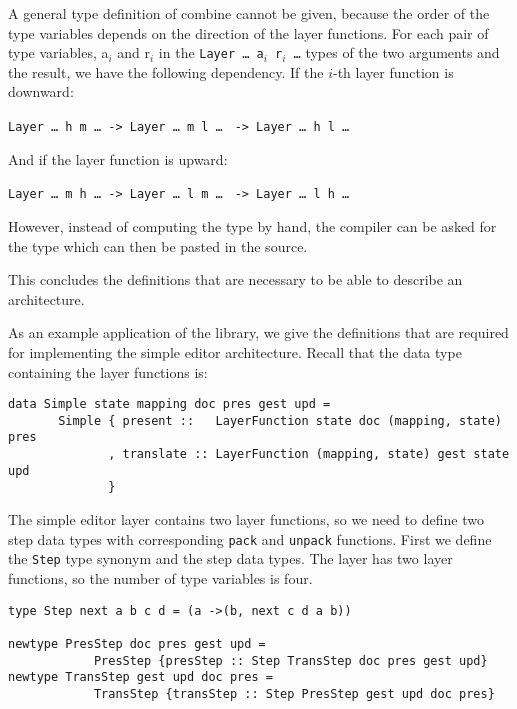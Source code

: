 A general type definition of combine cannot be given, because the order of the type variables depends on the direction of the layer functions. For each pair of type variables, a$_i$ and r$_i$ in the \texttt{Layer \dots~a$_i$ r$_i$ \dots} types of the two arguments and the result, we have the following dependency. If the $i$-th layer function is downward:

{\tt Layer \dots~h m \dots}\verb| -> |{\tt Layer \dots~m l \dots} \verb| -> |{\tt Layer \dots~h l \dots}

And if the layer function is upward:

{\tt Layer \dots~m h \dots}\verb| -> |{\tt Layer \dots~l m \dots} \verb| -> |{\tt Layer \dots~l h \dots}

However, instead of computing the type by hand, the compiler can be asked for the type which can then be pasted in the source.

This concludes the definitions that are necessary to be able to describe an architecture. 


 As an example application of the library, we give the definitions that are required for implementing the simple editor architecture. Recall that the data type containing the layer functions is:

\begin{small}
\begin{verbatim}
data Simple state mapping doc pres gest upd =
       Simple { present ::   LayerFunction state doc (mapping, state) pres
              , translate :: LayerFunction (mapping, state) gest state upd
              }
\end{verbatim}
\end{small}

The simple editor layer contains two layer functions, so we need to define two step data types with corresponding \texttt{pack} and \texttt{unpack} functions. First we define the \texttt{Step} type synonym and the step data types. The layer has two layer functions, so the number of type variables is four.

\begin{small}
\begin{verbatim}
type Step next a b c d = (a ->(b, next c d a b))

newtype PresStep doc pres gest upd = 
            PresStep {presStep :: Step TransStep doc pres gest upd}
newtype TransStep gest upd doc pres = 
            TransStep {transStep :: Step PresStep gest upd doc pres}
\end{verbatim}
\end{small}

